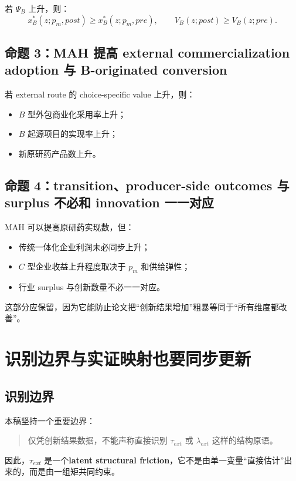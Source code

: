 \documentclass[12pt,fontset=none]{ctexart}
\begin{document}
若 $\Psi_B$ 上升，则：
\[
x_B^*(z;p_m,post)\ge x_B^*(z;p_m,pre),
\qquad
V_B(z;post)\ge V_B(z;pre).
\]

\subsection{命题 3：MAH 提高 external commercialization adoption 与 B-originated conversion}

若 external route 的 choice-specific value 上升，则：
\begin{itemize}
    \item $B$ 型外包商业化采用率上升；
    \item $B$ 起源项目的实现率上升；
    \item 新原研药产品数上升。
\end{itemize}

\subsection{命题 4：transition、producer-side outcomes 与 surplus 不必和 innovation 一一对应}

MAH 可以提高原研药实现数，但：
\begin{itemize}
    \item 传统一体化企业利润未必同步上升；
    \item $C$ 型企业收益上升程度取决于 $p_m$ 和供给弹性；
    \item 行业 surplus 与创新数量不必一一对应。
\end{itemize}

这部分应保留，因为它能防止论文把“创新结果增加”粗暴等同于“所有维度都改善”。

\section{识别边界与实证映射也要同步更新}

\subsection{识别边界}

本稿坚持一个重要边界：

\begin{quote}
仅凭创新结果数据，不能声称直接识别 $\tau_{ext}$ 或 $\lambda_{ext}$ 这样的结构原语。
\end{quote}

因此，$\tau_{ext}$ 是一个\textbf{latent structural friction}，它不是由单一变量“直接估计”出来的，而是由一组矩共同约束。
\end{document}
